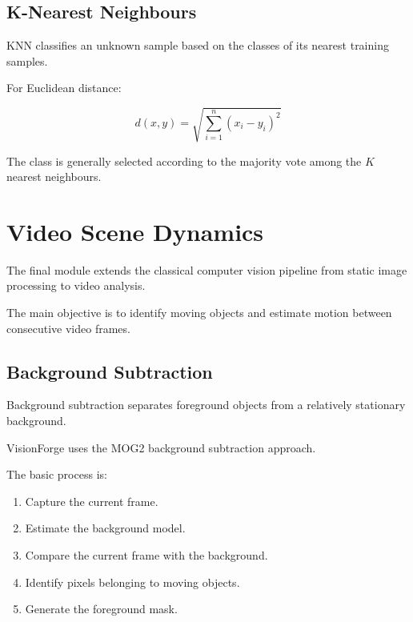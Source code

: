 \documentclass[11pt,a4paper]{article}
\begin{document}

\subsection{K-Nearest Neighbours}

KNN classifies an unknown sample based on the classes of its nearest training samples.

For Euclidean distance:

\begin{equation}
d(x,y)=
\sqrt{
\sum_{i=1}^{n}
(x_i-y_i)^2
}
\end{equation}

The class is generally selected according to the majority vote among the $K$ nearest neighbours.


\section{Video Scene Dynamics}

The final module extends the classical computer vision pipeline from static image processing to video analysis.

The main objective is to identify moving objects and estimate motion between consecutive video frames.


\subsection{Background Subtraction}

Background subtraction separates foreground objects from a relatively stationary background.

VisionForge uses the MOG2 background subtraction approach.

The basic process is:

\begin{enumerate}
    \item Capture the current frame.
    \item Estimate the background model.
    \item Compare the current frame with the background.
    \item Identify pixels belonging to moving objects.
    \item Generate the foreground mask.
\end{enumerate}
\end{document}
